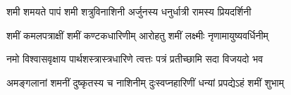 

\twolineshloka
{शमी शमयते पापं शमी शत्रुविनाशिनी}
{अर्जुनस्य धनुर्धात्री रामस्य प्रियदर्शिनी}

\twolineshloka
{शमीं कमलपत्राक्षीं शमीं कण्टकधारिणीम्}
{आरोहतु शमीं लक्ष्मीः नृणामायुष्यवर्धिनीम्}

\twolineshloka
{नमो विश्वासवृक्षाय पार्थशस्त्रास्त्रधारिणे}
{त्वत्तः पत्रं प्रतीच्छामि सदा विजयदो भव}

\twolineshloka
{अमङ्गलानां शमनीं दुष्कृतस्य च नाशिनीम्}
{दुःस्वप्नहारिणीं धन्यां प्रपद्येऽहं शमीं शुभाम्}
